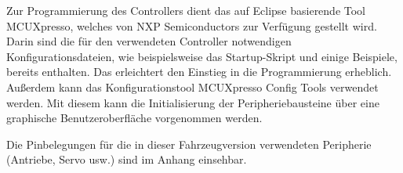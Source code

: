 Zur Programmierung des Controllers dient das auf Eclipse basierende Tool \glqq{}MCUXpresso\grqq{}, welches von NXP Semiconductors zur Verfügung gestellt wird. Darin sind die für den verwendeten Controller notwendigen Konfigurationsdateien, wie beispielsweise das Startup-Skript und einige Beispiele, bereits enthalten. Das erleichtert den Einstieg in die Programmierung erheblich. Außerdem kann das Konfigurationstool \glqq{}MCUXpresso Config Tools\grqq{} verwendet werden. Mit diesem kann die Initialisierung der Peripheriebausteine über eine graphische Benutzeroberfläche vorgenommen werden.\vspace{11pt}

Die Pinbelegungen für die in dieser Fahrzeugversion verwendeten Peripherie (Antriebe, Servo usw.) sind im Anhang \glqq{}\grqq{} einsehbar.

\newpage